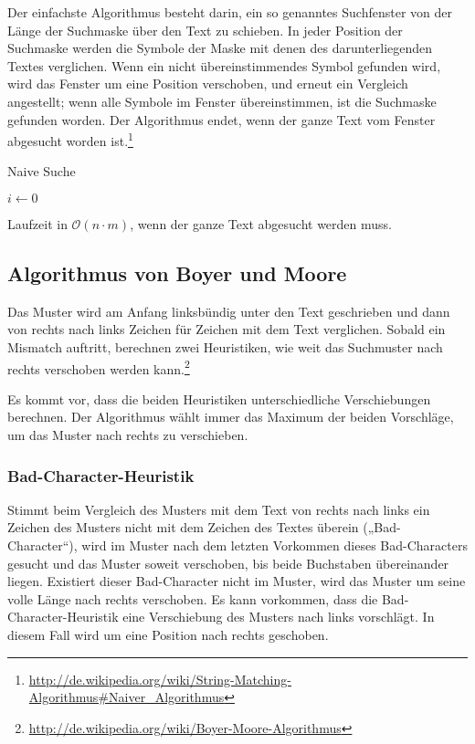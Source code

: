 Der einfachste Algorithmus besteht darin, ein so genanntes Suchfenster von der Länge der Suchmaske über den Text zu schieben. In jeder Position der Suchmaske werden die Symbole der Maske mit denen des darunterliegenden Textes verglichen. Wenn ein nicht übereinstimmendes Symbol gefunden wird, wird das Fenster um eine Position verschoben, und erneut ein Vergleich angestellt; wenn alle Symbole im Fenster übereinstimmen, ist die Suchmaske gefunden worden. Der Algorithmus endet, wenn der ganze Text vom Fenster abgesucht worden ist.\footnote{\url{http://de.wikipedia.org/wiki/String-Matching-Algorithmus\#Naiver_Algorithmus}}

\begin{algorithm}[H]
	\caption{Naive Suche}

	\BlankLine

	$i \longleftarrow 0$\newline
\end{algorithm}
Laufzeit in \(\mathcal{O}(n\cdot m)\), wenn der ganze Text abgesucht werden muss.

\subsection{Algorithmus von Boyer und Moore}
Das Muster wird am Anfang linksbündig unter den Text geschrieben und dann von rechts nach links Zeichen für Zeichen mit dem Text verglichen. Sobald ein Mismatch auftritt, berechnen zwei Heuristiken, wie weit das Suchmuster nach rechts verschoben werden kann.\footnote{\url{http://de.wikipedia.org/wiki/Boyer-Moore-Algorithmus}}

Es kommt vor, dass die beiden Heuristiken unterschiedliche Verschiebungen berechnen. Der Algorithmus wählt immer das Maximum der beiden Vorschläge, um das Muster nach rechts zu verschieben.

\subsubsection{Bad-Character-Heuristik}
Stimmt beim Vergleich des Musters mit dem Text von rechts nach links ein Zeichen des Musters nicht mit dem Zeichen des Textes überein („Bad-Character“), wird im Muster nach dem letzten Vorkommen dieses Bad-Characters gesucht und das Muster soweit verschoben, bis beide Buchstaben übereinander liegen. Existiert dieser Bad-Character nicht im Muster, wird das Muster um seine volle Länge nach rechts verschoben. Es kann vorkommen, dass die Bad-Character-Heuristik eine Verschiebung des Musters nach links vorschlägt. In diesem Fall wird um eine Position nach rechts geschoben.

